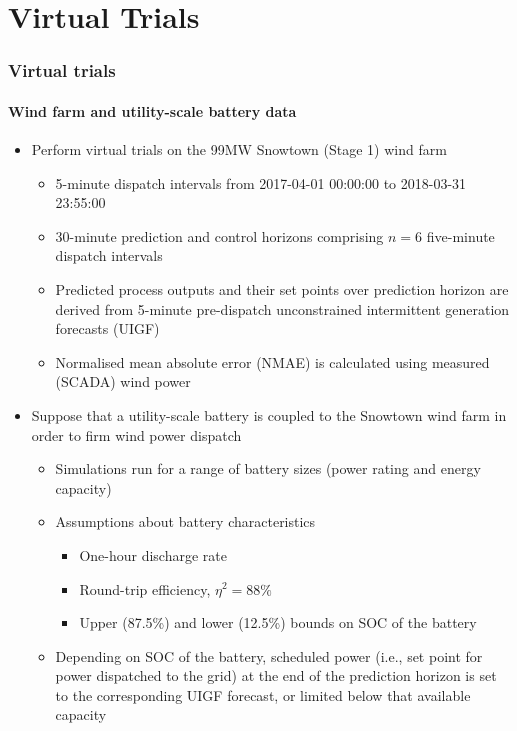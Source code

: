 \documentclass[presentation, smaller, table, svgnames]{beamer}
\begin{document}
\section{Virtual Trials}

\begin{frame}
	\frametitle{Virtual trials}
	\framesubtitle{Wind farm and utility-scale battery data}

	\begin{itemize}
		\item  Perform virtual trials on the 99MW Snowtown (Stage 1) wind farm
		\begin{itemize}
			\item  5-minute dispatch intervals from 2017-04-01 00:00:00 to 2018-03-31 23:55:00
			\item  30-minute prediction and control horizons comprising $n=6$ five-minute dispatch intervals
			\item  Predicted process outputs and their set points over prediction horizon are derived from 5-minute pre-dispatch unconstrained intermittent generation forecasts (UIGF)
			\item  Normalised mean absolute error (NMAE) is calculated using measured (SCADA) wind power
		\end{itemize}
		
		\item  Suppose that a utility-scale battery is coupled to the Snowtown wind farm in order to firm wind power dispatch
		\begin{itemize}
			\item  Simulations run for a range of battery sizes (power rating and energy capacity) 
			\item  Assumptions about battery characteristics
			\begin{itemize}
				\item  One-hour discharge rate
				\item  Round-trip efficiency, $\eta^{2} = 88\%$
				\item  Upper (87.5\%) and lower (12.5\%) bounds on SOC of the battery
			\end{itemize}
			\item  Depending on SOC of the battery, scheduled power (i.e., set point for power dispatched to the grid) at the end of the prediction horizon is set to the corresponding UIGF forecast, or limited below that available capacity
		\end{itemize}
				
	\end{itemize}
	
\end{frame}
\end{document}
